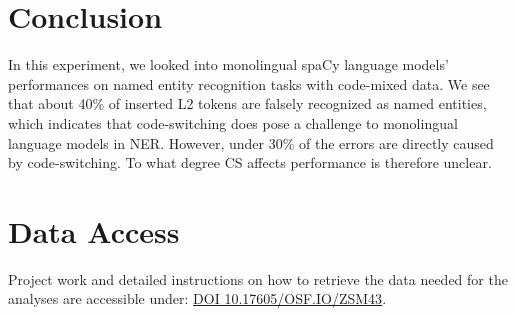 \documentclass[11pt]{article}
\begin{document}
\section{Conclusion}

In this experiment, we looked into monolingual spaCy language models' performances on named entity recognition tasks with code-mixed data. We see that about 40\% of inserted L2 tokens are falsely recognized as named entities, which indicates that code-switching does pose a challenge to monolingual language models in NER. However, under 30\% of the errors are directly caused by code-switching. To what degree CS affects performance is therefore unclear.








\appendix

\section{Data Access}

Project work and detailed instructions on how to retrieve the data needed for the analyses are accessible under: \href{https://osf.io/zsm43/}{DOI 10.17605/OSF.IO/ZSM43}.
\end{document}
